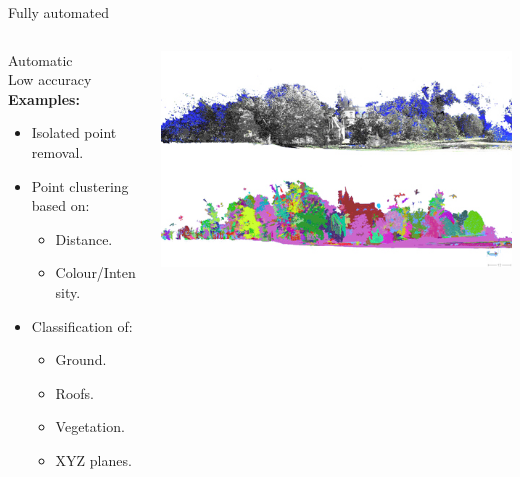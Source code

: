 \documentclass{beamer}
\begin{document}
\begin{frame}{Fully automated}

\begin{columns}[T]
\begin{column}{0.5\textwidth}

Automatic\\
Low accuracy\\

\textbf{Examples:}
\begin{itemize}
\item Isolated point removal.
\item Point clustering based on:
\begin{itemize}
\item Distance.
\item Colour/Intensity.
\end{itemize}
\item Classification of:
\begin{itemize}
\item Ground.
\item Roofs.
\item Vegetation.
\item XYZ planes.
\end{itemize}

\end{itemize}

\end{column}

\begin{column}{0.5\textwidth}

\includegraphics[width=1\textwidth]{pics/3DReshaper_auto_pt_cloud_seg.jpg}

\end{column}
\end{columns}

\end{frame}
\end{document}
